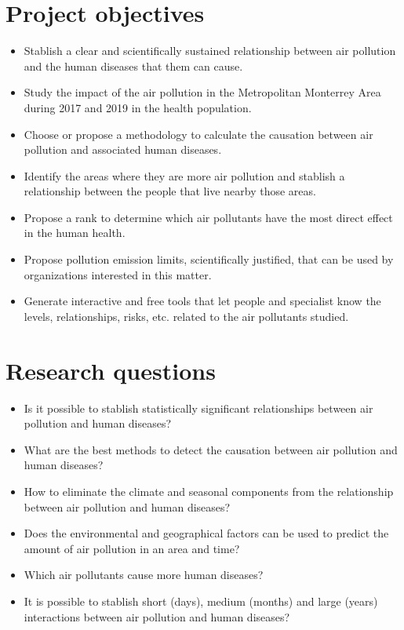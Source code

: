 \documentclass[
  11pt,
  a4paper,
  oneside
]{article}
\begin{document}
\section{Project objectives}
\begin{itemize}
    \setlength\itemsep{-0.5em}
    \item Stablish a clear and scientifically sustained relationship between air pollution and the human diseases that them can cause.
    \item Study the impact of the air pollution in the Metropolitan Monterrey Area during  2017 and 2019 in the health population.
    \item Choose or propose a methodology to calculate the causation between air pollution and associated human diseases.
    \item Identify the areas where they are more air pollution and stablish a relationship between the people that live nearby those areas.
    \item Propose a rank to determine which air pollutants have the most direct effect in the human health.
    \item Propose pollution emission limits, scientifically justified, that can be used by organizations interested in this matter.
    \item Generate interactive and free tools that let people and specialist know the levels, relationships, risks, etc. related to the air pollutants studied.
\end{itemize}

\section{Research questions}
\begin{itemize}
    \setlength\itemsep{-0.5em}
    \item Is it possible to stablish statistically significant relationships between air pollution and human diseases?
    \item What are the best methods to detect the causation between air pollution and human diseases?
    \item How to eliminate the climate and seasonal components from the relationship between air pollution and human diseases?
    \item Does the environmental and geographical factors can be used to predict the 
    amount of air pollution in an area and time?
    \item Which air pollutants cause more human diseases?
    \item It is possible to stablish short (days), medium (months) and large (years) interactions between air pollution and human diseases?
\end{itemize}
\end{document}
